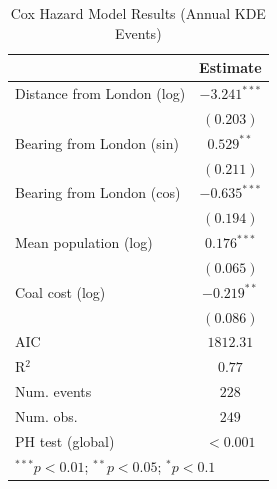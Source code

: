 
\begin{table}
\begin{center}
\begin{tabular}{l c}
\hline
 & Estimate \\
\hline
Distance from London (log) & $-3.241^{***}$ \\
 & $(0.203)$ \\
Bearing from London (sin) & $0.529^{**}$ \\
 & $(0.211)$ \\
Bearing from London (cos) & $-0.635^{***}$ \\
 & $(0.194)$ \\
Mean population (log) & $0.176^{***}$ \\
 & $(0.065)$ \\
Coal cost (log) & $-0.219^{**}$ \\
 & $(0.086)$ \\
\hline
AIC              & $1812.31$ \\
R$^2$            & $0.77$ \\
Num. events      & $228$ \\
Num. obs.        & $249$ \\
PH test (global) & $<0.001$ \\
\hline
\multicolumn{2}{l}{\scriptsize{$^{***}p<0.01$; $^{**}p<0.05$; $^{*}p<0.1$}}
\end{tabular}
\caption{Cox Hazard Model Results (Annual KDE Events)}
\label{tab:cox_annual}
\end{center}
\end{table}
